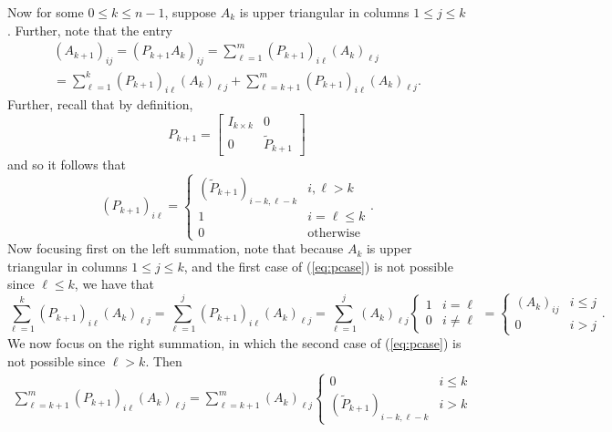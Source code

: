 \documentclass{../../../kin_math}
\begin{document}
\begin{questions}
\begin{enumerate}
\begin{solution}
      Now for some $0 \leq k \leq n - 1$, suppose $A_k$ is upper triangular in columns $1 \leq j \leq k$. Further, note that the entry
      \begin{multline*}
        (A_{k + 1})_{ij} = (P_{k + 1} A_k)_{ij} = \sum_{\ell = 1}^m (P_{k + 1})_{i \ell} (A_k)_{\ell j} \\
        = \sum_{\ell = 1}^k (P_{k + 1})_{i \ell} (A_k)_{\ell j} + \sum_{\ell = k + 1}^m (P_{k + 1})_{i \ell} (A_k)_{\ell j}.
      \end{multline*}
      Further, recall that by definition,
      \begin{equation*}
        P_{k + 1} = \begin{bmatrix} I_{k \times k} & 0 \\ 0 & \tilde{P}_{k + 1} \end{bmatrix}
      \end{equation*}
      and so it follows that
      \begin{equation}
        \label{eq:pcase}
        (P_{k + 1})_{i \ell} = \begin{cases} (\tilde{P}_{k + 1})_{i - k, \ell - k} & i, \ell > k \\ 1 & i = \ell \leq k \\ 0 & \text{otherwise} \end{cases}.
      \end{equation}
      Now focusing first on the left summation, note that because $A_k$ is upper triangular in columns $1 \leq j \leq k$, and the first case of (\ref{eq:pcase}) is not possible since $\ell \leq k$, we have that
      \begin{equation*}
        \sum_{\ell = 1}^k (P_{k + 1})_{i \ell} (A_k)_{\ell j} = \sum_{\ell = 1}^j (P_{k + 1})_{i \ell} (A_k)_{\ell j} = \sum_{\ell = 1}^j (A_k)_{\ell j} \begin{cases} 1 & i = \ell \\ 0 & i \neq \ell \end{cases} = \begin{cases} (A_k)_{ij} & i \leq j \\ 0 & i > j \end{cases}.
      \end{equation*}
      We now focus on the right summation, in which the second case of (\ref{eq:pcase}) is not possible since $\ell > k$. Then
      \begin{multline*}
        \sum_{\ell = k + 1}^m (P_{k + 1})_{i \ell} (A_k)_{\ell j} = \sum_{\ell = k + 1}^m (A_k)_{\ell j} \begin{cases} 0 & i \leq k \\ (\tilde{P}_{k + 1})_{i - k, \ell - k} & i > k \end{cases} \\

\end{multline*}
\end{solution}
\end{enumerate}
\end{questions}
\end{document}
